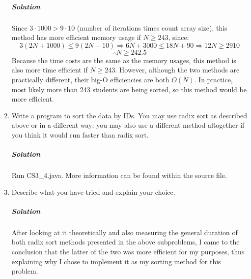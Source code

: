 \documentclass[a4paper]{amsart}
\newenvironment*{problem}{}{}
\begin{document}
\begin{problem}
\begin{enumerate}
			\subparagraph{\textbf{Solution}} Since $3\cdot 1000>9\cdot 10$ (number of iterations times count array size), this method has more efficient memory usage if $N\geq 243$, since:
			\[ 3(2N+1000)\leq 9(2N+10)\Rightarrow 6N+3000\leq 18N+90\Rightarrow 12N\geq 2910\]
			\[ \therefore N\geq 242.5 \]
			Because the time costs are the same as the memory usages, this method is also more time efficient if $N\geq 243$. However, although the two methods are practically different, their big-O efficiencies are both $O(N)$. In practice, most likely more than 243 students are being sorted, so this method would be more efficient.
			
			\item Write a program to sort the data by IDs. You may use radix sort as described above or in a different way; you may also use a different method altogether if you think it would run faster than radix sort.
			
			\subparagraph{\textbf{Solution}} Run CS3\_4.java. More information can be found within the source file. 
			
			\item Describe what you have tried and explain your choice.
			
			\subparagraph{\textbf{Solution}} After looking at it theoretically and also measuring the general duration of both radix sort methods presented in the above subproblems, I came to the conclusion that the latter of the two was more efficient for my purposes, thus explaining why I chose to implement it as my sorting method for this problem.
		\end{enumerate}
	\end{problem}
\end{document}

